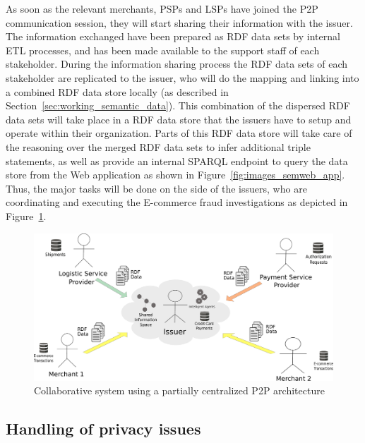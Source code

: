 As soon as the relevant merchants, \gls{PSP}s and \gls{LSP}s have joined the \gls{P2P} communication session, they will start sharing their information with the issuer. The information exchanged have been prepared as \gls{RDF} data sets by internal \gls{ETL} processes, and has been made available to the support staff of each stakeholder. During the information sharing process the \gls{RDF} data sets of each stakeholder are replicated to the issuer, who will do the mapping and linking into a combined \gls{RDF} data store locally (as described in Section~\ref{sec:working_semantic_data}). This combination of the dispersed \gls{RDF} data sets will take place in a \gls{RDF} data store that the issuers have to setup and operate within their organization. Parts of this \gls{RDF} data store will take care of the reasoning over the merged \gls{RDF} data sets to infer additional triple statements, as well as provide an internal \gls{SPARQL} endpoint to query the data store from the Web application as shown in Figure~\ref{fig:images_semweb_app}. \\

Thus, the major tasks will be done on the side of the issuers, who are coordinating and executing the \gls{E-commerce} fraud investigations as depicted in Figure~\ref{fig:images_p2p_centralized}.\@

\begin{figure}[H]
	\centering
		\includegraphics[width=0.9\columnwidth]{images/system_P2P_centralized.pdf}
	\caption{Collaborative system using a partially centralized \gls{P2P} architecture}
\label{fig:images_p2p_centralized}
\end{figure}


\subsection{Handling of privacy issues}
\label{subsec:p2p_partially_issuer_privacy}

